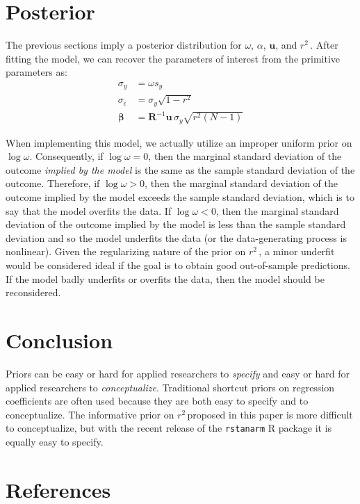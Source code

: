 \documentclass[11pt]{article}
\newcommand{\Rsq}{$r^2\,$}
\newcommand{\boldbeta}{\boldsymbol{\beta}}
\newcommand{\sigmaEps}{\sigma_{\epsilon}}
\newcommand{\R}{\mathbf{R}}
\begin{document}
\section{Posterior}

The previous sections imply a posterior distribution for $\omega$, $\alpha$,
$\mathbf{u}$, and \Rsq. After fitting the model, we can recover the parameters
of interest from the primitive parameters as:
%
\begin{align*}
\sigma_y &= \omega s_y \\
\sigmaEps &= \sigma_y \sqrt{1 - r^2} \\
\boldbeta &= \R^{-1} \mathbf{u} \, \sigma_y \sqrt{r^2 \left(N-1\right)}
\end{align*}

When implementing this model, we actually utilize an improper uniform prior on
$\log{\omega}$. Consequently, if $\log{\omega} = 0$, then the marginal standard
deviation of the outcome \emph{implied by the model} is the same as the sample
standard deviation of the outcome. Therefore, if $\log{\omega} > 0$, then the
marginal standard deviation of the outcome implied by the model exceeds the
sample standard deviation, which is to say that the model overfits the data. If
$\log{\omega} < 0$, then the marginal standard deviation of the outcome implied
by the model is less than the sample standard deviation and so the model
underfits the data (or the data-generating process is nonlinear). Given the
regularizing nature of the prior on \Rsq, a minor underfit would be considered
ideal if the goal is to obtain good out-of-sample predictions. If the model
badly underfits or overfits the data, then the model should be reconsidered.


\section{Conclusion}

Priors can be easy or hard for applied researchers to \emph{specify} and easy or
hard for applied researchers to \emph{conceptualize}. Traditional shortcut
priors on regression coefficients are often used because they are both easy to
specify and to conceptualize. The informative prior on \Rsq proposed in this
paper is more difficult to conceptualize, but with the recent release of the
{\tt rstanarm} R package it is equally easy to specify.


\section*{References}
\end{document}
